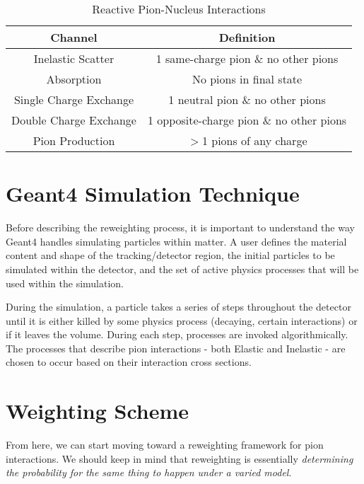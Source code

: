 \documentclass[12pt]{article}
\begin{document}
\begin{table}
\begin{center}
  \begin{tabular}{| c | c |}
  \hline
  Channel & Definition  \\  
  \hline	
  Inelastic Scatter & 1 same-charge pion \& no other pions \\
  \hline  
  Absorption & No pions in final state \\
  \hline
  Single Charge Exchange & 1 neutral pion \& no other pions \\
  \hline
  Double Charge Exchange & 1 opposite-charge pion \& no other pions \\
  \hline
  Pion Production & $>$1 pions of any charge \\
  \hline
  \end{tabular}
\end{center}
\caption{Reactive Pion-Nucleus Interactions\label{tab:fates}}
\end{table}

\section{Geant4 Simulation Technique}
Before describing the reweighting process, it is important to understand the way Geant4 handles simulating particles within matter. A user defines the material content and shape of the tracking/detector region, the initial particles to be simulated within the detector, and the set of active physics processes that will be used within the simulation. 

During the simulation, a particle takes a series of steps throughout the detector until it is either killed by some physics process (decaying, certain interactions) or if it leaves the volume. During each step, processes are invoked algorithmically. The processes that describe pion interactions - both Elastic and Inelastic - are chosen to occur based on their interaction cross sections. 

\section{Weighting Scheme}
From here, we can start moving toward a reweighting framework for pion interactions. We should keep in mind that reweighting is essentially \textit{determining the probability for the same thing to happen under a varied model}. 
\end{document}
